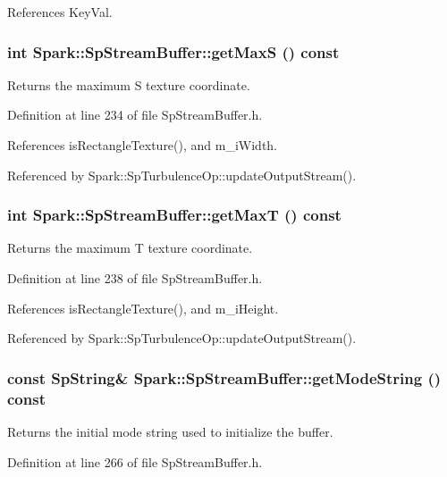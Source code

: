 References Key\-Val.
\subsubsection{\setlength{\rightskip}{0pt plus 5cm}int Spark::Sp\-Stream\-Buffer::get\-Max\-S () const\hspace{0.3cm}{\tt  [inline]}}\label{classSpark_1_1SpStreamBuffer_a21}


Returns the maximum S texture coordinate. 

Definition at line 234 of file Sp\-Stream\-Buffer.h.

References is\-Rectangle\-Texture(), and m\_\-i\-Width.

Referenced by Spark::Sp\-Turbulence\-Op::update\-Output\-Stream().
\subsubsection{\setlength{\rightskip}{0pt plus 5cm}int Spark::Sp\-Stream\-Buffer::get\-Max\-T () const\hspace{0.3cm}{\tt  [inline]}}\label{classSpark_1_1SpStreamBuffer_a22}


Returns the maximum T texture coordinate. 

Definition at line 238 of file Sp\-Stream\-Buffer.h.

References is\-Rectangle\-Texture(), and m\_\-i\-Height.

Referenced by Spark::Sp\-Turbulence\-Op::update\-Output\-Stream().
\subsubsection{\setlength{\rightskip}{0pt plus 5cm}const {\bf Sp\-String}\& Spark::Sp\-Stream\-Buffer::get\-Mode\-String () const\hspace{0.3cm}{\tt  [inline]}}\label{classSpark_1_1SpStreamBuffer_a29}


Returns the initial mode string used to initialize the buffer. 

Definition at line 266 of file Sp\-Stream\-Buffer.h.

